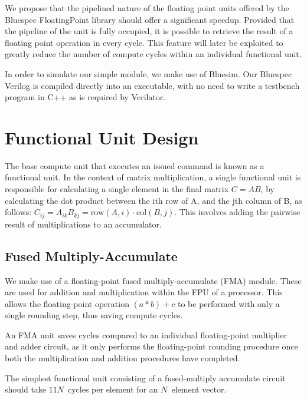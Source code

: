 \documentclass[a4paper,8pt]{report}
\begin{document}
We propose that the pipelined nature of the floating point units offered by the
Bluespec FloatingPoint library should offer a significant speedup. Provided that
the pipeline of the unit is fully occupied, it is possible to retrieve the result
of a floating point operation in every cycle. This feature will later be
exploited to greatly reduce the number of compute cycles within an individual
functional unit.

In order to simulate our simple module, we make use of Bluesim. Our Bluespec
Verilog is compiled directly into an executable, with no need to write a
testbench program in C++ as is required by Verilator. 

\section{Functional Unit Design}
The base compute unit that executes an issued command is known as a functional
unit. In the context of matrix multiplication, a single functional unit is
responsible for calculating a single element in the final matrix $C = AB$, by
calculating the dot product between the ith row of A, and the jth column of B,
as follows: $C_{ij} = A_{ik}B_{kj} = \text{row}(A,i) \cdot \text{col}(B,j)$.
This involves adding the pairwise result of multiplications to an accumulator.

\subsection{Fused Multiply-Accumulate}
We make use of a floating-point fused multiply-accumulate (FMA) module. These are used
for addition and multiplication within the FPU of a processor. This allows the
floating-point operation $(a*b)+c$ to be performed with only a single rounding
step, thus saving compute cycles.

An FMA unit saves cycles compared to an individual floating-point multiplier and
adder circuit, as it only performs the floating-point rounding procedure once
both the multiplication and addition procedures have completed.

The simplest functional unit consisting of a fused-multiply accumulate circuit
should take $11N$~cycles per element for an $N$~element vector.





\end{document}
